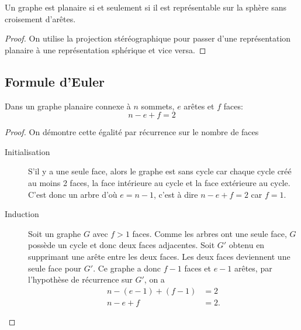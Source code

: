 \begin{mytheo}
  Un graphe est planaire si et seulement si il est représentable sur la sphère sans croisement d'arêtes.
  \begin{proof}
  On utilise la projection stéréographique pour passer d'une représentation planaire à une représentation sphérique et vice versa.
  \end{proof}
\end{mytheo}

\subsection{Formule d'Euler}
\begin{mytheo} 
  Dans un graphe planaire connexe à $n$ sommets, $e$ arêtes et $f$ faces:
  $$n − e + f = 2$$
  \begin{proof}
    On démontre cette égalité par récurrence sur le nombre de faces
    \begin{description}
      \item[Initialisation]
        S'il y a une seule face, alors le graphe est sans cycle car chaque cycle créé au moins 2 faces, la face intérieure au cycle
        et la face extérieure au cycle.
        C'est donc un arbre d'où $e = n-1$, c'est à dire $n - e + f = 2$ car $f = 1$.
      \item[Induction]
        Soit un graphe $G$ avec $f > 1$ faces.
        Comme les arbres ont une seule face, $G$ possède un cycle et donc deux faces adjacentes.
        Soit $G'$ obtenu en supprimant une arête entre les deux faces.
        Les deux faces deviennent une seule face pour $G'$.
        Ce graphe a donc $f - 1$ faces et $e-1$ arêtes, par l'hypothèse de récurrence sur $G'$, on a
        \begin{align*}
          n - (e-1) + (f-1) & = 2\\
          n - e + f & = 2.
        \end{align*}
    \end{description}
  \end{proof}
\end{mytheo}

